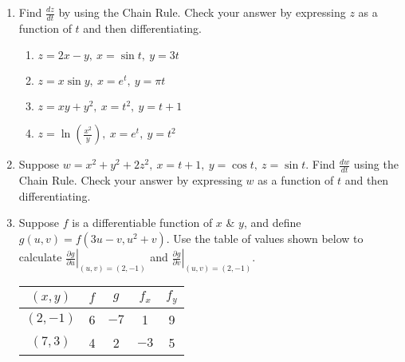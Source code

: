 \documentclass[12pt]{article}
\newif\ifans
\begin{document}
\begin{enumerate}

\item Find $\frac{d z}{d t}$ by using the Chain Rule.  Check your answer by expressing $z$ as a function of $t$ and then differentiating. 
 
\begin{enumerate}

\item $z=2x-y,\ x=\sin{t},\ y=3t$ 

\ifans{\fbox{$\frac{dz}{dt}=2\cos{t}-3$}} \fi

\item $z=x\sin{y},\ x=e^t,\ y=\pi t$ 

\ifans{\fbox{$\frac{dz}{dt}=e^{t}\sin{(\pi t)}+\pi e^{t}\cos{(\pi t)}$}} \fi

\item $z=xy+y^2,\ x=t^2,\ y=t+1$ 

\ifans{\fbox{$\frac{dz}{dt}=3t^2+4t+2$}} \fi

\item $z=\ln{\left(\frac{x^2}{y}\right)},\ x=e^{t},\ y=t^2$ 

\ifans{\fbox{$\frac{dz}{dt}=2-\frac{2}{t}$}} \fi

\end{enumerate}

\item  Suppose $w=x^2+y^2+2z^2,\ x=t+1,\ y=\cos{t},\ z=\sin{t}$.   Find $\frac{d w}{d t}$ using the Chain Rule.  Check your answer by expressing $w$ as a function of $t$ and then differentiating.

\ifans{\fbox{$\frac{dw}{dt}=2t+2+2\sin{t}\cos{t}$}} \fi

\item Suppose $f$ is a differentiable function of $x$ \& $y$, and define $g(u,v)=f(3u-v,u^2+v)$.  Use the table of values shown below to calculate $\left.\frac{\partial g}{\partial u}\right|_{(u,v)=(2,-1)}$ and $\left.\frac{\partial g}{\partial v}\right|_{(u,v)=(2,-1)}$.

\begin{center}
\begin{tabular}{|c|c|c|c|c|}
\hline
$(x,y)$& $f$ & $g$ & $f_x$ & $f_y$\\
\hline
$(2,-1)$ & 6 & $-7$ & 1 & 9\\
\hline
$(7,3)$ & 4 & 2 & $-3$ & 5\\
\hline
\end{tabular}
\end{center}


\end{enumerate}
\end{document}
